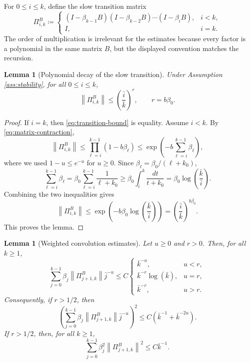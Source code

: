 \documentclass{article}
\newtheorem{lemma}[theorem]{Lemma}
\newcommand{\norm}[1]{\left\lVert #1\right\rVert}
\begin{document}
For $0\le i\le k$, define the slow transition matrix
\begin{equation}
  \Pi^B_{i,k}\coloneqq
  \begin{cases}
    (I-\beta_{k-1}B)(I-\beta_{k-2}B)\cdots(I-\beta_iB), & i<k,\\
    I, & i=k.
  \end{cases} \label{eq:B-transition}
\end{equation}
The order of multiplication is irrelevant for the estimates because every factor is a polynomial in the same matrix $B$, but the displayed convention matches the recursion.

\begin{lemma}[Polynomial decay of the slow transition]\label{lem:transition}
Under Assumption \ref{ass:stability}, for all $0\le i\le k$,
\begin{equation}
  \norm{\Pi^B_{i,k}}
  \le \left(\frac{\bar i}{\bar k}\right)^r,
  \qquad r=b\beta_0. \label{eq:transition-bound}
\end{equation}
\end{lemma}

\begin{proof}
If $i=k$, then \eqref{eq:transition-bound} is equality. Assume $i<k$. By \eqref{eq:matrix-contraction},
\[
  \norm{\Pi^B_{i,k}}
  \le \prod_{\ell=i}^{k-1}(1-b\beta_\ell)
  \le \exp\left(-b\sum_{\ell=i}^{k-1}\beta_\ell\right),
\]
where we used $1-u\le e^{-u}$ for $u\ge0$. Since $\beta_\ell=\beta_0/(\ell+k_0)$,
\[
  \sum_{\ell=i}^{k-1}\beta_\ell
  =\beta_0\sum_{\ell=i}^{k-1}\frac1{\ell+k_0}
  \ge \beta_0\int_i^k \frac{dt}{t+k_0}
  =\beta_0\log\left(\frac{\bar k}{\bar i}\right).
\]
Combining the two inequalities gives
\[
  \norm{\Pi^B_{i,k}}
  \le \exp\left(-b\beta_0\log\left(\frac{\bar k}{\bar i}\right)\right)
  =\left(\frac{\bar i}{\bar k}\right)^{b\beta_0}.
\]
This proves the lemma.
\end{proof}

\begin{lemma}[Weighted convolution estimates]\label{lem:weighted-sums}
Let $u\ge0$ and $r>0$. Then, for all $k\ge1$,
\begin{equation}
  \sum_{j=0}^{k-1}\beta_j\norm{\Pi^B_{j+1,k}}\bar j^{-u}
  \le
  C
  \begin{cases}
    \bar k^{-u}, & u<r,\\
    \bar k^{-r}\log(\bar k), & u=r,\\
    \bar k^{-r}, & u>r.
  \end{cases} \label{eq:weighted-first}
\end{equation}
Consequently, if $r>1/2$, then
\begin{equation}
  \left(
  \sum_{j=0}^{k-1}\beta_j\norm{\Pi^B_{j+1,k}}\bar j^{-u}
  \right)^2
  \le C\left(\bar k^{-1}+\bar k^{-2u}\right). \label{eq:weighted-first-squared}
\end{equation}
If $r>1/2$, then, for all $k\ge1$,
\begin{equation}
  \sum_{j=0}^{k-1}\beta_j^2\norm{\Pi^B_{j+1,k}}^2
  \le C\bar k^{-1}. \label{eq:weighted-second}
\end{equation}
\end{lemma}
\end{document}
